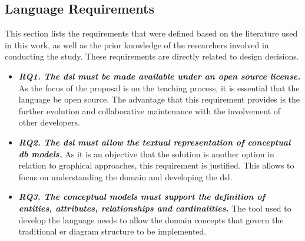 \subsection{Language Requirements} \label{ssec_tool:langRequirements}
This section lists the requirements that were defined based on the literature used in this work, as well as the prior knowledge of the researchers involved in conducting the study.
These requirements are directly related to design decisions.

\begin{itemize}

\item\textit{\textbf{RQ1. The \ac{dsl} must be made available under an open source license.}}
As the focus of the proposal is on the teaching process, it is essential that the language be open source.
The advantage that this requirement provides is the further evolution and collaborative maintenance with the involvement of other developers.

\item\textit{\textbf{RQ2. The \ac{dsl} must allow the textual representation of conceptual \ac{db} models.}}
As it is an objective that the solution is another option in relation to graphical approaches, this requirement is justified.
This allows to focus on understanding the domain and developing the \ac{dsl}.

\item\textit{\textbf{RQ3. The conceptual models must support the definition of entities, attributes, relationships and cardinalities.}}
The tool used to develop the language needs to allow the domain concepts that govern the traditional \ac{er} diagram structure to be implemented.


\end{itemize}
